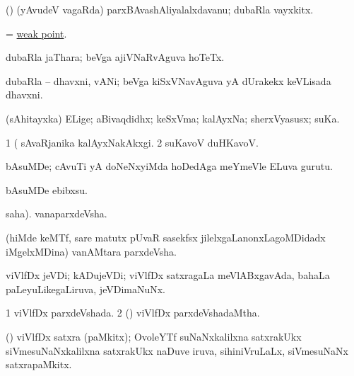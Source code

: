\bentry
{} 
\gl{\nA}
\expl{}
\bmng
(\ame) (yAvudeV vagaRda) parxBAvashAliyalalxdavanu; dubaRla vayxkitx. 
\emng
\eentry

\bentry
{} 
\gl{\nA}
\expl{}
\bmng
= \hyperlink{weak point}{weak point}. 
\emng
\eentry

\bentry
{} 
\gl{\nA}
\expl{}
\bmng
dubaRla jaThara; beVga ajiVNaRvAguva hoTeTx. 
\emng
\eentry

\bentry
{} 
\gl{\nA}
\expl{}
\bmng
dubaRla -- dhavxni, vANi; beVga kiSxVNavAguva yA dUrakekx keVLisada dhavxni. 
\emng
\eentry

\bentry
{} 
\gl{\nA}
\expl{}
\bmng
(sAhitayxka) ELige; aBivaqdidhx; keSxVma; kalAyxNa; sherxVyasusx; suKa. 
\emng

\noindent 
\gl{\pagu}
\expl{}
\bmng
\bnum
\num{1}  (  sAvaRjanika kalAyxNakAkxgi. 
\num{2}  suKavoV duHKavoV. 
\enum
\emng
\eentry

\bentry
{} 
\gl{\nA}
\expl{}
\bmng
bAsuMDe; cAvuTi yA doNeNxyiMda hoDedAga meYmeVle ELuva gurutu. 
\emng
\eentry

\bentry
{} 
\gl{\sakirx}
\expl{}
\bmng
bAsuMDe ebibxsu. 
\emng
\eentry

\bentry
{} 
\gl{\nA}
\expl{}
\bmng
{} saha). vanaparxdeVsha. 
\emng

\noindent 
\gl{\pagu}
\expl{}
\bmng
{} (hiMde keMTf, sare matutx pUvaR sasekfsx jilelxgaLanonxLagoMDidadx iMgelxMDina) vanAMtara parxdeVsha. 
\emng
\eentry

\bentry
{} 
\gl{\nA}
\expl{}
\bmng
viVlfDx jeVDi; kADujeVDi; viVlfDx satxragaLa meVlABxgavAda, bahaLa paLeyuLikegaLiruva, jeVDimaNuNx. 
\emng
\eentry

\bentry
{} 
\gl{\gu}
\expl{}
\bmng
\bnum
\num{1} viVlfDx parxdeVshada. 
\num{2} (\BUvi) viVlfDx parxdeVshadaMtha. 
\enum
\emng
\eentry

\bentry
{} 
\gl{\nA}
\expl{}
\bmng
(\BUvi) viVlfDx satxra (paMkitx); OvoleYTf suNaNxkalilxna satxrakUkx siVmesuNaNxkalilxna satxrakUkx naDuve iruva, sihiniVruLaLx, siVmesuNaNx satxrapaMkitx. 
\emng
\eentry

